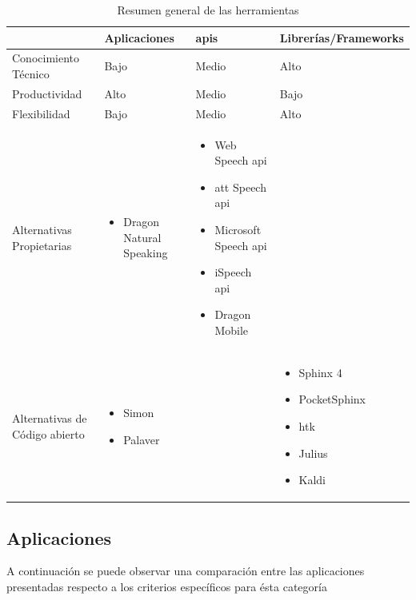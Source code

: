 \begin{table}[H]
\centering
\footnotesize
\begin{tabular}{|p{3.5cm}|>{\centering}p{3.5cm}|>{\centering}p{3.5cm}|>{\centering}p{3.5cm}|}
\hline
                               & Aplicaciones             &  \gls{api}s                            & Librer\'ias/Frameworks \tabularnewline
\hline
Conocimiento T\'ecnico         &     Bajo                    & Medio                            & Alto    \tabularnewline
Productividad                  &     Alto                    & Medio                            & Bajo    \tabularnewline
Flexibilidad                   &     Bajo                    & Medio                            & Alto    \tabularnewline \hline
Alternativas Propietarias      & \begin{itemize} \item Dragon Natural Speaking \end{itemize}  & \begin{itemize} \item Web Speech \gls{api} \item \gls{att} Speech \gls{api} \item Microsoft Speech \gls{api} \item iSpeech \gls{api} \item Dragon Mobile \end{itemize}  &  \tabularnewline \hline
Alternativas de Código abierto & \begin{itemize} \item Simon \item Palaver \end{itemize}          &                                  & \begin{itemize} \item Sphinx 4 \item PocketSphinx \item \gls{htk} \item Julius \item Kaldi \end{itemize} \tabularnewline
\hline
\end{tabular}
\caption{Resumen general de las herramientas}
\label{sec:resumen-herramientas}
\end{table}

\subsection{Aplicaciones}

A continuaci\'on se puede observar una comparaci\'on entre las aplicaciones presentadas respecto a los criterios espec\'ificos
para \'esta categor\'ia


